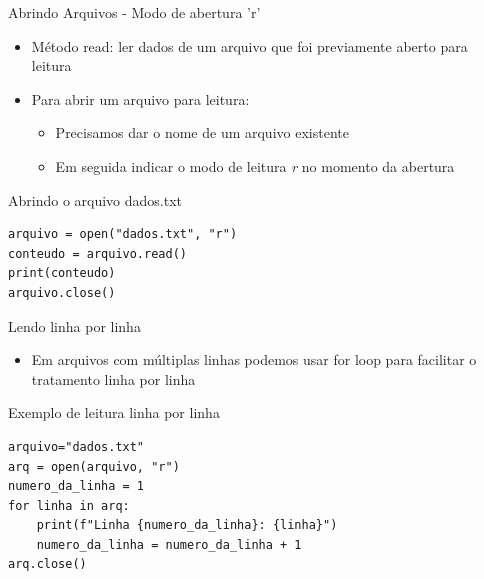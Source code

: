 \begin{frame}[fragile]{Abrindo Arquivos - Modo de abertura 'r'}
    \begin{itemize}
        \item Método read: ler dados de um arquivo que foi previamente aberto para leitura
        \item Para abrir um arquivo para leitura:
              \begin{itemize}
                  \item Precisamos dar o nome de um arquivo existente
                  \item Em seguida indicar o modo de leitura \textit{r} no momento da abertura
              \end{itemize}

    \end{itemize}

    \begin{block}{Abrindo o arquivo dados.txt}
        \begin{verbatim}
arquivo = open("dados.txt", "r")
conteudo = arquivo.read()
print(conteudo)
arquivo.close()
\end{verbatim}
    \end{block}

\end{frame}



\begin{frame}[fragile]{Lendo linha por linha}

    \begin{itemize}
        \item Em arquivos com múltiplas linhas podemos usar for loop para facilitar o tratamento linha por linha
    \end{itemize}

    \begin{exampleblock}{Exemplo de leitura linha por linha}
        \begin{verbatim}
arquivo="dados.txt"
arq = open(arquivo, "r")
numero_da_linha = 1
for linha in arq:
    print(f"Linha {numero_da_linha}: {linha}")
    numero_da_linha = numero_da_linha + 1
arq.close()
\end{verbatim}
    \end{exampleblock}


\end{frame}

